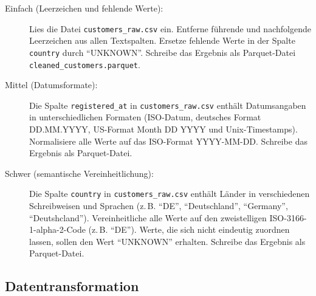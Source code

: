 \begin{description}
    \item[Einfach (Leerzeichen und fehlende Werte):] Lies die Datei
    \texttt{customers\_raw.csv} ein. Entferne führende und nachfolgende
    Leerzeichen aus allen Textspalten. Ersetze fehlende Werte in der Spalte
    \texttt{country} durch \enquote{UNKNOWN}. Schreibe das Ergebnis als
    Parquet-Datei \texttt{cleaned\_customers.parquet}.

    \item[Mittel (Datumsformate):] Die Spalte \texttt{registered\_at} in
    \texttt{customers\_raw.csv} enthält Datumsangaben in unterschiedlichen
    Formaten (ISO-Datum, deutsches Format DD.MM.YYYY, US-Format Month DD YYYY
    und Unix-Timestamps). Normalisiere alle Werte auf das ISO-Format
    YYYY-MM-DD. Schreibe das Ergebnis als Parquet-Datei.

    \item[Schwer (semantische Vereinheitlichung):] Die Spalte \texttt{country}
    in \texttt{customers\_raw.csv} enthält Länder in verschiedenen Schreibweisen
    und Sprachen (z.\,B. \enquote{DE}, \enquote{Deutschland},
    \enquote{Germany}, \enquote{Deutshcland}). Vereinheitliche alle Werte auf
    den zweistelligen ISO-3166-1-alpha-2-Code (z.\,B. \enquote{DE}). Werte, die
    sich nicht eindeutig zuordnen lassen, sollen den Wert \enquote{UNKNOWN}
    erhalten. Schreibe das Ergebnis als Parquet-Datei.
\end{description}

\subsection*{Datentransformation}

